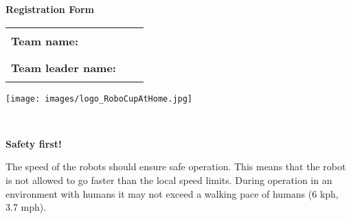 \newpage

\begin{minipage}[t]{0.8\textwidth}%

\vspace{0pt}
{\huge \textbf{Registration Form} }

\vspace{5 em}

\newcommand{\rightRule}{\rule{0.7\linewidth}{.2pt}}

\begin{tabular}{ @{} l l l}

\textbf{Team name:} & \rightRule \\[.9 em]%

\textbf{Team leader name:} & \rightRule \\[.9 em]%




\end{tabular}

\vspace{1 em}

\end{minipage}
\hfill
\begin{minipage}[t]{0.15\textwidth}%
\vspace{0pt}
	\texttt{[image: images/logo\_RoboCupAtHome.jpg]}%
\end{minipage}\\

\vspace{1 em}

\noindent\textbf{Safety first!}

\noindent The speed of the robots should ensure safe operation. 
This means that the robot is not allowed to go faster than the local speed limits. 
During operation in an environment with humans it may not exceed a walking pace of humans (6 kph, 3.7 mph). 

